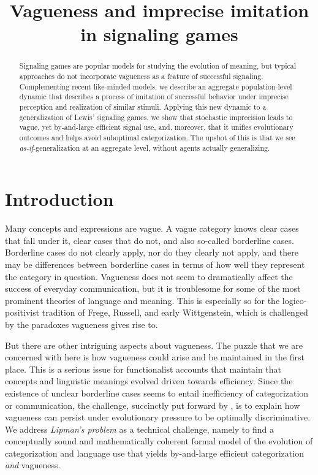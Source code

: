 \documentclass[fleqn,reqno,10pt]{article}
\title{Vagueness and imprecise imitation in signaling games}
\date{}
\begin{document}
\maketitle

\begin{abstract}
  Signaling games are popular models for studying the evolution of meaning, but typical
  approaches do not incorporate vagueness as a feature of successful signaling.  Complementing
  recent like-minded models, we describe an aggregate population-level dynamic that describes a
  process of imitation of successful behavior under imprecise perception and realization of
  similar stimuli. Applying this new dynamic to a generalization of Lewis' signaling games, we
  show that stochastic imprecision leads to vague, yet by-and-large efficient signal use, and,
  moreover, that it unifies evolutionary outcomes and helps avoid suboptimal
  categorization. The upshot of this is that we see \emph{as-if}-generalization at an aggregate
  level, without agents actually generalizing.
\end{abstract}

\section{Introduction}
\label{sec:introduction}

Many concepts and expressions are vague. A vague category knows clear
cases that fall under it, clear cases that do not, and also so-called
borderline cases. Borderline cases do not clearly apply, nor do they
clearly not apply, and there may be differences between borderline
cases in terms of how well they represent the category in
question. Vagueness does not seem to dramatically affect the success
of everyday communication, but it is troublesome for some of the most
prominent theories of language and meaning. This is especially so for the logico-positivist tradition of Frege, Russell, and early
Wittgenstein, which is challenged by the paradoxes vagueness gives rise
to.

But there are other intriguing aspects about vagueness. The puzzle
that we are concerned with here is how vagueness could arise and be
maintained in the first place. This is a serious issue for
functionalist accounts that maintain that concepts and linguistic
meanings evolved driven towards efficiency. Since the existence of
unclear borderline cases seems to entail inefficiency of
categorization or communication, the challenge, succinctly put forward
by \citet{Lipman2009:Why-is-Language}, is to explain how vagueness can
persist under evolutionary pressure to be optimally discriminative. We
address \emph{Lipman's problem} as a technical challenge, namely to
find a conceptually sound and mathematically coherent formal model of
the evolution of categorization and language use that yields
by-and-large efficient categorization \emph{and} vagueness.
\end{document}
